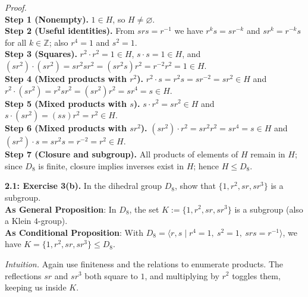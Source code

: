 \documentclass[12pt]{article}
\theoremstyle{definition}
\begin{document}
\emph{Proof.}\\
\textbf{Step 1 (Nonempty).} $1\in H$, so $H\neq\varnothing$.\\
\textbf{Step 2 (Useful identities).} From $srs=r^{-1}$ we have $r^k s=s r^{-k}$ and $s r^k=r^{-k}s$ for all $k\in\mathbb Z$; also $r^4=1$ and $s^2=1$.\\
\textbf{Step 3 (Squares).} $r^2\cdot r^2=1\in H$, $s\cdot s=1\in H$, and $(sr^2)\cdot(sr^2)=s r^2 s r^2=(s r^2 s) r^2=r^{-2}r^2=1\in H$.\\
\textbf{Step 4 (Mixed products with $r^2$).} $r^2\cdot s=r^2 s=s r^{-2}=s r^2\in H$ and $r^2\cdot (s r^2)=r^2 s r^2=(s r^2) r^2=s r^4=s\in H$.\\
\textbf{Step 5 (Mixed products with $s$).} $s\cdot r^2=s r^2\in H$ and $s\cdot (s r^2)=(s s) r^2=r^2\in H$.\\
\textbf{Step 6 (Mixed products with $sr^2$).} $(s r^2)\cdot r^2=s r^2 r^2=s r^4=s\in H$ and $(s r^2)\cdot s=s r^2 s=r^{-2}=r^2\in H$.\\
\textbf{Step 7 (Closure and subgroup).} All products of elements of $H$ remain in $H$; since $D_8$ is finite, closure implies inverses exist in $H$; hence $H\le D_8$.\\

\newpage

\noindent \textbf{2.1: Exercise 3(b).} In the dihedral group $D_8$, show that $\{1,r^2,sr,sr^3\}$ is a subgroup.\\ %

\noindent\textbf{As General Proposition}: In $D_8$, the set $K:=\{1,r^2,sr,sr^3\}$ is a subgroup (also a Klein $4$-group).\\

\noindent \textbf{As Conditional Proposition}: With $D_8=\langle r,s\mid r^4=1,\ s^2=1,\ srs=r^{-1}\rangle$, we have $K=\{1,r^2,sr,sr^3\}\le D_8$.

\newpage

\dotfill

\emph{Intuition.} Again use finiteness and the relations to enumerate products. The reflections $sr$ and $sr^3$ both square to $1$, and multiplying by $r^2$ toggles them, keeping us inside $K$.\\

\dotfill
\end{document}
